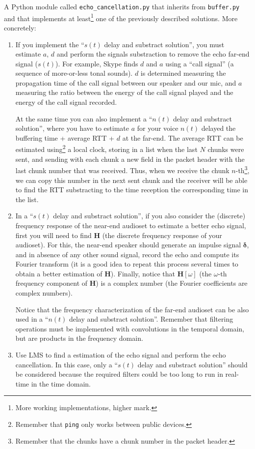 A Python module called \texttt{echo\_cancellation.py} that inherits
from \texttt{buffer.py} and that implements at least\footnote{More
  working implementations, higher mark.} one of the previously
described solutions. More concretely:
\begin{enumerate}

\item If you implement the ``$s(t)$ delay and substract solution'',
  you must estimate $a$, $d$ and perform the signals substraction to
  remove the echo far-end signal ($s(t)$). For example, Skype finds
  $d$ and $a$ using a ``call signal'' (a sequence of more-or-less
  tonal sounds). $d$ is determined measuring the propagation time of
  the call signal between our speaker and our mic, and $a$ measuring
  the ratio between the energy of the call signal played and the
  energy of the call signal recorded.

  At the same time you can also implement a ``$n(t)$ delay and
  substract solution'', where you have to estimate $a$ for your voice
  $n(t)$ delayed the buffering time + average RTT + $d$ at the
  far-end. The average RTT can be estimated using\footnote{Remember
    that \texttt{ping} only works between public devices.} a local
  clock, storing in a list when the last $N$ chunks were sent, and
  sending with each chunk a new field in the packet header with the
  last chunk number that was received. Thus, when we receive the chunk
  $n$-th\footnote{Remember that the chunks have a chunk number in the
    packet header.}, we can copy this number in the next sent chunk
  and the receiver will be able to find the RTT substracting to the
  time reception the corresponding time in the list.

\item In a ``$s(t)$ delay and substract solution'', if you also
  consider the (discrete) frequency response of the near-end audioset
  to estimate a better echo signal, first you will need to find
  ${\mathbf H}$ (the discrete frequency response of your
  audioset). For this, the near-end speaker should generate an impulse
  signal ${\mathbf \delta}$, and in absence of any other sound signal,
  record the echo and compute its Fourier transform (it is a good idea
  to repeat this process several times to obtain a better estimation
  of ${\mathbf H}$). Finally, notice that ${\mathbf H}[\omega]$ (the
  $\omega$-th frequency component of ${\mathbf H}$) is a complex
  number (the Fourier coefficients are complex numbers).

  Notice that the frequency characterization of the far-end audioset
  can be also used in a ``$n(t)$ delay and substract
  solution''. Remember that filtering operations must be implemented
  with convolutions in the temporal domain, but are products in the
  frequency domain.
  
\item Use LMS to find a estimation of the echo signal and perform the
  echo cancellation. In this case, only a ``$s(t)$ delay and substract
  solution'' should be considered because the required filters could
  be too long to run in real-time in the time domain.
\end{enumerate}

